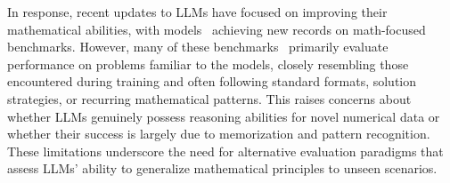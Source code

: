 In response, recent updates to LLMs have focused on improving their mathematical abilities, with models~\citep{math_servey, math_discover} achieving new records on math-focused benchmarks. However, many of these benchmarks~\citep{Galactica, mathbenchmark} primarily evaluate performance on problems familiar to the models, closely resembling those encountered during training and often following standard formats, solution strategies, or recurring mathematical patterns. This raises concerns about whether LLMs genuinely possess reasoning abilities for novel numerical data or whether their success is largely due to memorization and pattern recognition. These limitations underscore the need for alternative evaluation paradigms that assess LLMs' ability to generalize mathematical principles to unseen scenarios.




